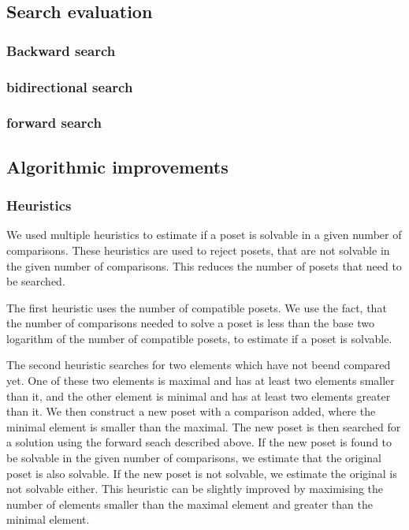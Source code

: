 \documentclass[10pt,journal,compsoc]{IEEEtran}
\begin{document}
\subsection{Search evaluation}
\subsubsection{Backward search}
\subsubsection{bidirectional search}
\subsubsection{forward search}

\subsection{Algorithmic improvements}

\subsubsection{Heuristics}

We used multiple heuristics to estimate if a poset is solvable in a given number of comparisons.
These heuristics are used to reject posets, that are not solvable in the given number of comparisons.
This reduces the number of posets that need to be searched.

The first heuristic uses the number of compatible posets.
We use the fact, that the number of comparisons needed to solve a poset is less than the base two logarithm of the number of compatible posets,
to estimate if a poset is solvable.

The second heuristic searches for two elements which have not beend compared yet.
One of these two elements is maximal and has at least two elements smaller than it,
and the other element is minimal and has at least two elements greater than it.
We then construct a new poset with a comparison added, where the minimal element is smaller than the maximal.
The new poset is then searched for a solution using the forward seach described above.
If the new poset is found to be solvable in the given number of comparisons, we estimate that the original poset is also solvable.
If the new poset is not solvable, we estimate the original is not solvable either.
This heuristic can be slightly improved by maximising the number of elements smaller than the maximal element and greater than the minimal element.
\end{document}
